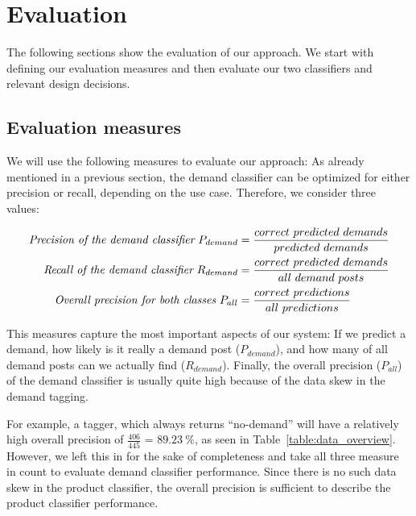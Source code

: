 
\section{Evaluation}
\label{sec:evaluation}


The following sections show the evaluation of our approach.
We start with defining our evaluation measures and then evaluate our two classifiers and relevant design decisions.

\subsection{Evaluation measures}
\label{sub:evaluation_measures}
We will use the following measures to evaluate our approach:
As already mentioned in a previous section, the demand classifier can be optimized for either precision or recall, depending on the use case.
Therefore, we consider three values:

\begin{align*}
	\emph{Precision of the demand classifier}~P_{demand} 			&= \frac{correct~predicted~demands}{predicted~demands} \\
	\emph{Recall of the demand classifier}~R_{demand} 				&= \frac{correct~predicted~demands}{all~demand~posts} \\
	\emph{Overall precision for both classes}~P_{all} &= \frac{correct~predictions}{all~predictions} \\
\end{align*}

This measures capture the most important aspects of our system: If we predict a demand, how likely is it really a demand post ($P_{demand}$), and how many of all demand posts can we actually find ($R_{demand}$).
Finally, the overall precision ($P_{all}$) of the demand classifier is usually quite high because of the data skew in the demand tagging.

For example, a tagger, which always returns ``no-demand'' will have a relatively high overall precision of $\frac{406}{445}$ = $89.23~\%$, as seen in Table~\ref{table:data_overview}.
However, we left this in for the sake of completeness and take all three measure in count to evaluate demand classifier performance.
Since there is no such data skew in the product classifier, the overall precision is sufficient to describe the product classifier performance.

